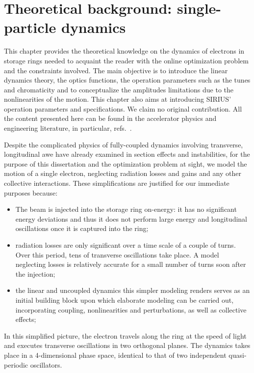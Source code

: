 \chapter{Theoretical background: single-particle dynamics}
This chapter provides the theoretical knowledge on the dynamics of electrons in storage rings needed to acquaint the reader with the online optimization problem and the constraints involved. The main objective is to introduce the linear dynamics theory, the optics functions, the operation parameters such as the tunes and chromaticity and to conceptualize the amplitudes limitations due to the nonlinearities of the motion. This chapter also aims at introducing SIRIUS' operation parameters and specifications. We claim no original contribution. All the content presented here can be found in the accelerator physics and engineering literature, in particular, refs.~\cite{sands_physics_1969,lee_accelerator_2004,wiedemann_particle_2015,wolski_beam_2014}.

Despite the complicated physics of fully-coupled dynamics involving transverse, longitudinal awe have already examined in section effects and instabilities, for the purpose of this dissertation and the optimization problem at sight, we model the motion of a single electron, neglecting radiation losses and gains and any other collective interactions. These simplifications are justified for our immediate purposes because:
\begin{itemize}
    \item The beam is injected into the storage ring on-energy: it has no significant energy deviations and thus it does not perform large energy and longitudinal oscillations once it is captured into the ring;
    \item radiation losses are only significant over a time scale of a couple of turns. Over this period, tens of transverse oscillations take place. A model neglecting losses is relatively accurate for a small number of turns soon after the injection;
    \item the linear and uncoupled dynamics this simpler modeling renders serves as an initial building block upon which elaborate modeling can be carried out, incorporating coupling, nonlinearities and perturbations, as well as collective effects;
\end{itemize}
In this simplified picture, the electron travels along the ring at the speed of light and executes transverse oscillations in two orthogonal planes. The dynamics takes place in a 4-dimensional phase space, identical to that of two independent quasi-periodic oscillators.

